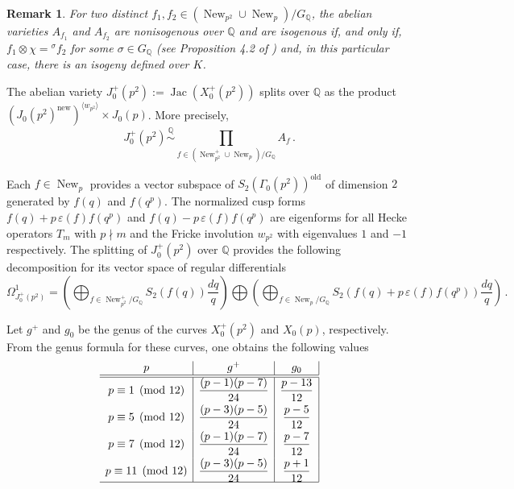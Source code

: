 \documentclass[a4paper,12pt]{article}
\newtheorem{rem}{Remark}%
\theoremstyle{definition}
\theoremstyle{remark}
\numberwithin{equation}{section}
\newcommand{\Q}{\mathbb{Q}}
\newcommand{\Jac}{\operatorname{Jac}}
\newcommand{\new}{\operatorname{new}}
\newcommand{\New}{\operatorname{New}}
\begin{document}
\begin{rem} For two distinct $f_1, f_2\in(\New_{p^2}\cup\New_p)/G_\Q$, the abelian varieties $A_{f_1}$ and $A_{f_2}$ are nonisogenous over $\Q$ and are isogenous if, and only if, $f_1\otimes \chi={}^{\sigma} f_2$ for some $\sigma\in G_\Q$ (see Proposition 4.2 of \cite{goji}) and, in this particular case, there is an isogeny defined over $K$.
\end{rem}

  The abelian variety $J_0^+(p^2):=\Jac (X_0^+(p^2))$ splits over $\Q$ as the product
$(J_0(p^2)^{\new})^{\langle w_{p^2}\rangle}\times J_0(p)$. More precisely,
\begin{equation}\label{split}
 J_0^+(p^2)\stackrel{\Q}\sim \prod_{f\in(\New_{p^2}^+\cup\New_p)/G_{\Q}} A_f\,.
\end{equation}

Each $f\in \New_p$ provides a vector subspace of $S_2(\Gamma_0(p^2))^{\operatorname{old}}$ of dimension $2$ genera\-ted by  $f(q)$ and $f(q^p)$. The normalized cusp forms $f(q)+p\,\varepsilon(f) f(q^p)$ and $f(q)-p\,\varepsilon(f) f(q^p)$ are eigenforms  for all Hecke operators $T_m$ with $p\nmid m$ and the Fricke involution $w_{p^2}$ with eigenvalues $1$ and $-1$ respectively.
 The splitting of $J_0^+(p^2)$  over $\Q$ provides the following decomposition for its vector space of regular differentials
\begin{equation}\label{diferencial}
\Omega^1_{J_0^+(p^2)}=\left(\bigoplus_{f\in\New_{p^2}^+/G_\Q}S_2(f(q))\frac{dq}{q}\right)\bigoplus\left(\bigoplus_{f\in\New_{p}/G_\Q} S_2(f(q)+p\,\varepsilon(f)f(q^p))\frac{dq}{q}\right)\,.
\end{equation}

 Let $g^+$ and $g_0$ be  the genus of the curves  $ X_0^+(p^2)$ and  $X_0(p)$,  respectively. From the genus formula for these curves, one obtains the following values
$$
\begin{array}{c|c|c|}
p  &   g^+ &g_0\\ \hline\hline
p\equiv 1 \pmod{12} &\displaystyle{\frac{(p-1)(p-7)}{24}}   & \displaystyle{\frac{p-13}{12}}\\[6 pt]
 p\equiv 5 \pmod{12} &\displaystyle{ \frac{(p-3)(p-5)}{24}  } & \displaystyle{\frac{p-5}{12} }\\[6 pt]
 p\equiv 7 \pmod{12}  & \displaystyle{ \frac{(p-1)(p-7)}{24}  }&\displaystyle{\frac{p-7}{12}} \\[6 pt]
 p\equiv 11 \pmod{12} &\displaystyle{ \frac{(p-3)(p-5)}{24} } & \displaystyle{\frac{p+1}{12}}\\\hline
\end{array}
$$
\end{document}
